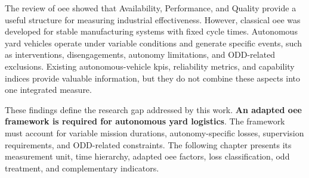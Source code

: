 The review of \gls{oee} showed that Availability, Performance, and Quality provide a useful structure for measuring industrial effectiveness. However, classical \gls{oee} was developed for stable manufacturing systems with fixed cycle times. Autonomous yard vehicles operate under variable conditions and generate specific events, such as interventions, disengagements, autonomy limitations, and ODD-related exclusions. Existing autonomous-vehicle \gls{kpi}s, reliability metrics, and capability indices provide valuable information, but they do not combine these aspects into one integrated measure.

These findings define the research gap addressed by this work. \textbf{An adapted \gls{oee} framework is required for autonomous yard logistics}. The framework must account for variable mission durations, autonomy-specific losses, supervision requirements, and ODD-related constraints. The following chapter presents its measurement unit, time hierarchy, adapted \gls{oee} factors, loss classification, \gls{odd} treatment, and complementary indicators.